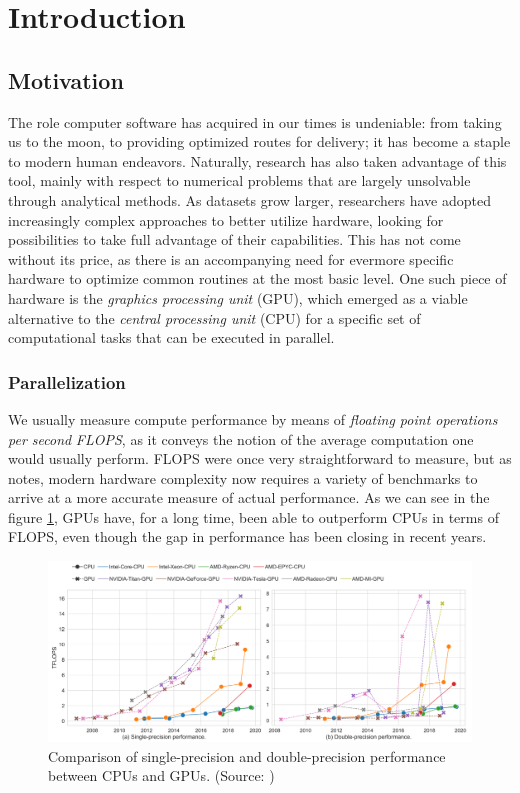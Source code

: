 \documentclass[conference, onecolumn]{IEEEtran}
\begin{document}
\listoftodos

\section{Introduction} \label{sec:intro}

\subsection{Motivation} \label{sec:intro:motivation}

The role computer software has acquired in our times is undeniable:
from taking us to the moon, to providing optimized routes for delivery; it has
become a staple to modern human endeavors.
Naturally, research has also taken advantage of this tool, mainly with
respect to numerical problems that are largely unsolvable through analytical
methods.
As datasets grow larger, researchers have adopted increasingly complex
approaches to better utilize hardware, looking for possibilities to take full
advantage of their capabilities.
This has not come without its price, as there is an accompanying need for
evermore specific hardware to optimize common routines at the most basic level.
One such piece of hardware is the \textit{graphics processing unit} (GPU),
which emerged as a viable alternative to the \textit{central processing unit}
(CPU) for a specific set of computational tasks that can be executed in
parallel.

\subsubsection{Parallelization} \label{sec:motivation:parallelization}

We usually measure compute performance by means of \textit{floating point
operations per second} \textit{FLOPS}, as it conveys the notion of the average
computation one would usually perform.
FLOPS were once very straightforward to measure, but as
\cite{dolbeau2018theoretical} notes, modern hardware complexity now
requires a variety of benchmarks to arrive at a more accurate measure of actual
performance.
As we can see in the figure \cref{fig:cpu-vs-gpu-flops}, GPUs have, for a long
time, been able to outperform CPUs in terms of FLOPS, even though the gap in
performance has been closing in recent years.

\begin{figure}[ht]
    \centering
    \includegraphics[width=0.9\linewidth]{gpu-vs-cpu-flops.png}
    \caption{Comparison of single-precision and double-precision performance
    between CPUs and GPUs. (Source: \cite{sun2019summarizing})}
    \label{fig:cpu-vs-gpu-flops}
\end{figure}
\end{document}

